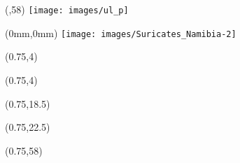 \begin{textblock*}{\bandeorwidth}(\banderougewidth,58\TPVertModule)
  \texttt{[image: images/ul\_p]}
\end{textblock*}

\begin{textblock*}{\paperwidth}(0mm,0mm)
  \texttt{[image: images/Suricates\_Namibia-2]}
\end{textblock*}

\begin{textblock*}{\textwidth}(0.75\TPHorizModule,4\TPVertModule)
  {\par\color{black!10}\titlefmt\par}
\end{textblock*}

\null\cleardoublepage


\begin{textblock*}{\textwidth}(0.75\TPHorizModule,4\TPVertModule)
  \titlefmt
\end{textblock*}

\begin{textblock*}{\textwidth}(0.75\TPHorizModule,18.5\TPVertModule)
  \authorfmt
\end{textblock*}

\begin{textblock*}{\textwidth}(0.75\TPHorizModule,22.5\TPVertModule)
  \affiliation
\end{textblock*}

\begin{textblock*}{\textwidth}(0.75\TPHorizModule,58\TPVertModule)
  \edition
\end{textblock*}
\endgroup

